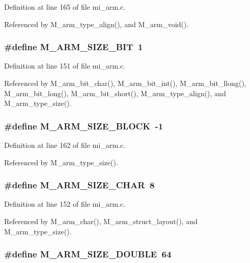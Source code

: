 Definition at line 165 of file mi\_\-arm.c.

Referenced by M\_\-arm\_\-type\_\-align(), and M\_\-arm\_\-void().
\subsubsection{\setlength{\rightskip}{0pt plus 5cm}\#define M\_\-ARM\_\-SIZE\_\-BIT~1}\label{mi__arm_8c_f6b3e0b04abc8086bb9185e4c265e35c}




Definition at line 151 of file mi\_\-arm.c.

Referenced by M\_\-arm\_\-bit\_\-char(), M\_\-arm\_\-bit\_\-int(), M\_\-arm\_\-bit\_\-llong(), M\_\-arm\_\-bit\_\-long(), M\_\-arm\_\-bit\_\-short(), M\_\-arm\_\-type\_\-align(), and M\_\-arm\_\-type\_\-size().
\subsubsection{\setlength{\rightskip}{0pt plus 5cm}\#define M\_\-ARM\_\-SIZE\_\-BLOCK~-1}\label{mi__arm_8c_ff72691295353470fa386a37a660ea08}




Definition at line 162 of file mi\_\-arm.c.

Referenced by M\_\-arm\_\-type\_\-size().
\subsubsection{\setlength{\rightskip}{0pt plus 5cm}\#define M\_\-ARM\_\-SIZE\_\-CHAR~8}\label{mi__arm_8c_4f09e0e331c1bdafc1104c846ecceae6}




Definition at line 152 of file mi\_\-arm.c.

Referenced by M\_\-arm\_\-char(), M\_\-arm\_\-struct\_\-layout(), and M\_\-arm\_\-type\_\-size().
\subsubsection{\setlength{\rightskip}{0pt plus 5cm}\#define M\_\-ARM\_\-SIZE\_\-DOUBLE~64}\label{mi__arm_8c_28f72e3ba146b889bf639c4197dd6f86}




